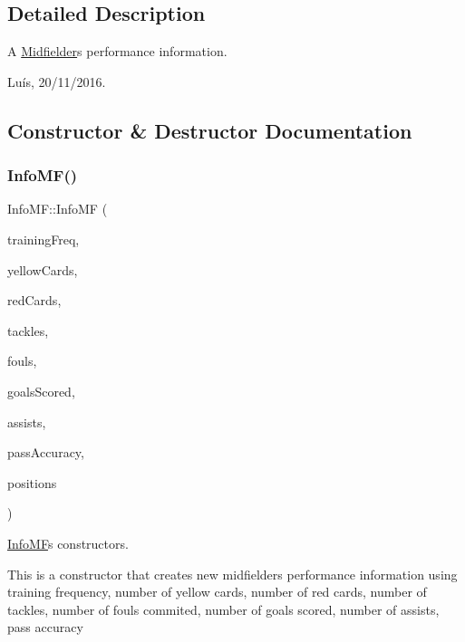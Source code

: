 \subsection{Detailed Description}
A \hyperlink{class_midfielder}{Midfielder}\textquotesingle{}s performance information. 

Luís, 20/11/2016. 

\subsection{Constructor \& Destructor Documentation}
\hypertarget{class_info_m_f_ab5ee5aa88e26c288415c6f29545e0279}{}\label{class_info_m_f_ab5ee5aa88e26c288415c6f29545e0279} 
\subsubsection{\texorpdfstring{Info\+M\+F()}{InfoMF()}\hspace{0.1cm}{\footnotesize\ttfamily [1/4]}}
{\footnotesize\ttfamily Info\+M\+F\+::\+Info\+MF (\begin{DoxyParamCaption}\item[{\hyperlink{class_fraction}{Fraction}}]{training\+Freq,  }\item[{unsigned int}]{yellow\+Cards,  }\item[{unsigned int}]{red\+Cards,  }\item[{unsigned int}]{tackles,  }\item[{unsigned int}]{fouls,  }\item[{unsigned int}]{goals\+Scored,  }\item[{unsigned int}]{assists,  }\item[{\hyperlink{class_fraction}{Fraction}}]{pass\+Accuracy,  }\item[{vector$<$ \hyperlink{_utils_8hpp_a9f9328fe291d23e820ad594679abd217}{Midfielder\+Position} $>$}]{positions }\end{DoxyParamCaption})}



\hyperlink{class_info_m_f}{Info\+MF}\textquotesingle{}s constructors. 

This is a constructor that creates new midfielder\textquotesingle{}s performance information using training frequency, number of yellow cards, number of red cards, number of tackles, number of fouls commited, number of goals scored, number of assists, pass accuracy 

